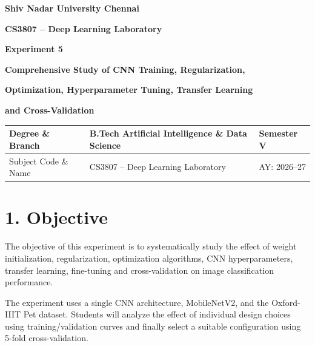 \documentclass[10pt]{article}
\begin{document}

\begin{center}

{\large\textbf{Shiv Nadar University Chennai}}

\vspace{2mm}

{\normalsize\textbf{CS3807 -- Deep Learning Laboratory}}

\vspace{2mm}

{\large\textbf{Experiment 5}}

\vspace{1mm}

{\normalsize\textbf{Comprehensive Study of CNN Training, Regularization,}}

{\normalsize\textbf{Optimization, Hyperparameter Tuning, Transfer Learning}}

{\normalsize\textbf{and Cross-Validation}}

\end{center}

\vspace{3mm}

\begin{tabular}{|p{3.4cm}|p{9.0cm}|p{1.4cm}|}
\hline
Degree \& Branch &
B.Tech Artificial Intelligence \& Data Science &
Semester V\\
\hline
Subject Code \& Name &
CS3807 -- Deep Learning Laboratory &
AY: 2026--27\\
\hline
\end{tabular}

\section*{1. Objective}

The objective of this experiment is to systematically study the effect of
weight initialization, regularization, optimization algorithms, CNN
hyperparameters, transfer learning, fine-tuning and cross-validation on
image classification performance.

The experiment uses a single CNN architecture, MobileNetV2, and the
Oxford-IIIT Pet dataset. Students will analyze the effect of individual
design choices using training/validation curves and finally select a
suitable configuration using 5-fold cross-validation.
\end{document}

